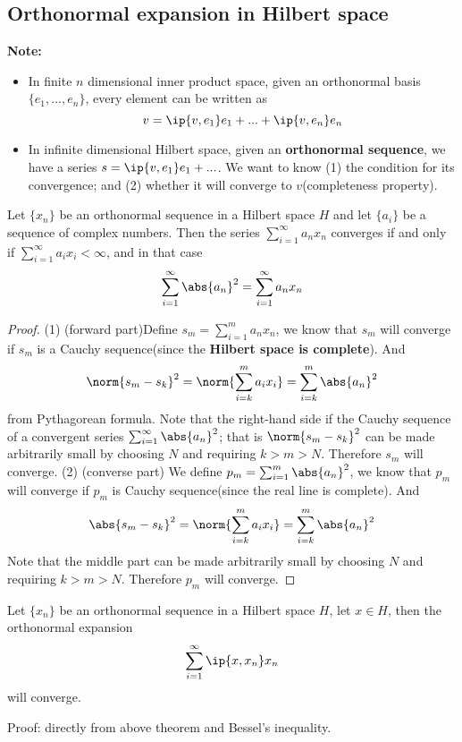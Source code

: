 \begin{refsection}
\subsection{Orthonormal expansion in Hilbert space}
\begin{mdframed}
	\textbf{Note:}\\
	\begin{itemize}
		\item In finite $n$ dimensional inner product space, given an orthonormal basis $\{e_1,...,e_n\}$,  every element can be written as
		$$v = \ip{v,e_1}e_1 + ... + \ip{v,e_n}e_n$$
		\item In infinite dimensional Hilbert space, given an \textbf{orthonormal sequence},
		we have a series $s = \ip{v,e_1}e_1 + ... $. We want to know (1) the condition for its convergence; and (2) whether it will converge to $v$(completeness property).
	\end{itemize}
\end{mdframed}


\begin{theorem}
	Let $\{x_n\}$ be an orthonormal sequence in a Hilbert space $H$ and let $\{a_i\}$ be a sequence of complex numbers. Then the series $\sum_{i=1}^\infty a_n x_n$ converges if and only if $\sum_{i=1}^\infty a_i x_i < \infty$, and in that case
	$$\sum_{i=1}^\infty \abs{a_n}^2  = \sum_{i=1}^\infty a_n x_n$$
\end{theorem}
\begin{proof}
	(1) (forward part)Define $s_m = \sum_{i=1}^m a_n x_n$, we know that $s_m$ will converge if $s_m$ is a Cauchy sequence(since the \textbf{Hilbert space is complete}). And 
	$$\norm{s_m-s_k}^2 = \norm{\sum_{i=k}^m a_i x_i}  = \sum_{i=k}^m \abs{a_n}^2$$
	from Pythagorean formula. Note that the right-hand side if the Cauchy sequence of a convergent series $\sum_{i=1}^\infty \abs{a_n}^2 $; that is $\norm{s_m-s_k}^2$ can be made arbitrarily small by choosing $N$ and requiring $k>m>N$. Therefore $s_m$ will converge.
	(2) (converse part) We define $p_m = \sum_{i=1}^m \abs{a_n}^2$, we know that $p_m$ will converge if $p_m$ is Cauchy sequence(since the real line is complete). And 
	$$\abs{s_m-s_k}^2 = \norm{\sum_{i=k}^m a_i x_i}  = \sum_{i=k}^m \abs{a_n}^2$$
	Note that the middle part can be made arbitrarily small by choosing $N$ and requiring $k>m>N$. Therefore $p_m$ will converge.	
\end{proof}


\begin{corollary}
	Let $\{x_n\}$ be an orthonormal sequence in a Hilbert space $H$, let $x \in H$, then
	the orthonormal expansion
	$$\sum_{i=1}^\infty \ip{x,x_n} x_n$$
	will converge.
\end{corollary}
Proof: directly from above theorem and Bessel's inequality.






\end{refsection}
